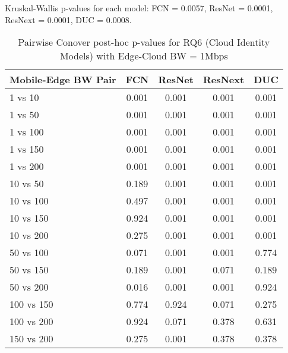 \begin{table}[h]
\centering
\caption{Pairwise Conover post-hoc p-values for RQ6 (Cloud Identity Models) with Edge-Cloud BW = 1Mbps}
\label{tab:conover_cloud_identity_ec1}
\smallskip
Kruskal-Wallis p-values for each model: FCN = 0.0057, ResNet = 0.0001, ResNext = 0.0001, DUC = 0.0008.

\begin{tabular}{lcccc}
\toprule
Mobile-Edge BW Pair & FCN & ResNet & ResNext & DUC \\
\midrule
1 vs 10 & 0.001 & 0.001 & 0.001 & 0.001 \\
1 vs 50 & 0.001 & 0.001 & 0.001 & 0.001 \\
1 vs 100 & 0.001 & 0.001 & 0.001 & 0.001 \\
1 vs 150 & 0.001 & 0.001 & 0.001 & 0.001 \\
1 vs 200 & 0.001 & 0.001 & 0.001 & 0.001 \\
10 vs 50 & 0.189 & 0.001 & 0.001 & 0.001 \\
10 vs 100 & 0.497 & 0.001 & 0.001 & 0.001 \\
10 vs 150 & 0.924 & 0.001 & 0.001 & 0.001 \\
10 vs 200 & 0.275 & 0.001 & 0.001 & 0.001 \\
50 vs 100 & 0.071 & 0.001 & 0.001 & 0.774 \\
50 vs 150 & 0.189 & 0.001 & 0.071 & 0.189 \\
50 vs 200 & 0.016 & 0.001 & 0.001 & 0.924 \\
100 vs 150 & 0.774 & 0.924 & 0.071 & 0.275 \\
100 vs 200 & 0.924 & 0.071 & 0.378 & 0.631 \\
150 vs 200 & 0.275 & 0.001 & 0.378 & 0.378 \\
\bottomrule
\end{tabular}
\end{table}

